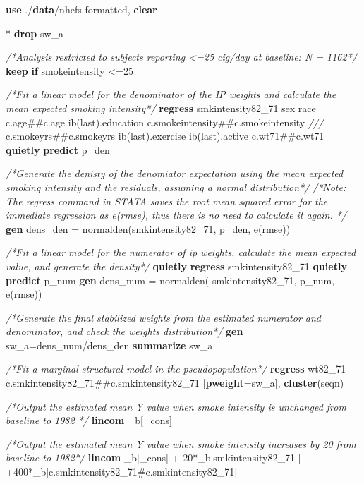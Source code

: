 \documentclass[
  10pt,
]{book}
\newenvironment{Shaded}{\begin{snugshade}}{\end{snugshade}}
\newcommand{\CommentTok}[1]{\textcolor[rgb]{0.56,0.35,0.01}{\textit{#1}}}
\newcommand{\DataTypeTok}[1]{\textcolor[rgb]{0.13,0.29,0.53}{#1}}
\newcommand{\FunctionTok}[1]{\textcolor[rgb]{0.00,0.00,0.00}{#1}}
\newcommand{\KeywordTok}[1]{\textcolor[rgb]{0.13,0.29,0.53}{\textbf{#1}}}
\newcommand{\NormalTok}[1]{#1}
\begin{document}
\begin{Shaded}
\begin{Highlighting}[]
\KeywordTok{use}\NormalTok{ ./}\KeywordTok{data}\NormalTok{/nhefs{-}formatted, }\KeywordTok{clear}

\NormalTok{* }\KeywordTok{drop}\NormalTok{ sw\_a}

\CommentTok{/*Analysis restricted to subjects reporting \textless{}=25 cig/day at baseline: N = 1162*/}
\KeywordTok{keep} \KeywordTok{if}\NormalTok{ smokeintensity \textless{}=25}

\CommentTok{/*Fit a linear model for the denominator of the IP weights and calculate the mean expected smoking intensity*/} 
\KeywordTok{regress}\NormalTok{ smkintensity82\_71 sex race c.age\#\#c.age ib(}\FunctionTok{last}\NormalTok{).education c.smokeintensity\#\#c.smokeintensity }\CommentTok{///}
\NormalTok{c.smokeyrs\#\#c.smokeyrs ib(}\FunctionTok{last}\NormalTok{).exercise ib(}\FunctionTok{last}\NormalTok{).active c.wt71\#\#c.wt71}
\KeywordTok{quietly} \KeywordTok{predict}\NormalTok{ p\_den}

\CommentTok{/*Generate the denisty of the denomiator expectation using the mean expected smoking intensity and the residuals, assuming a normal distribution*/}
\CommentTok{/*Note: The regress command in STATA saves the root mean squared error for the immediate regression as e(rmse), thus there is no need to calculate it again. */}
\KeywordTok{gen}\NormalTok{ dens\_den = }\FunctionTok{normalden}\NormalTok{(smkintensity82\_71, p\_den, }\FunctionTok{e}\NormalTok{(rmse))}

\CommentTok{/*Fit a linear model for the numerator of ip weights, calculate the mean expected value, and generate the density*/}
\KeywordTok{quietly} \KeywordTok{regress}\NormalTok{ smkintensity82\_71}
\KeywordTok{quietly} \KeywordTok{predict}\NormalTok{ p\_num}
\KeywordTok{gen}\NormalTok{ dens\_num = }\FunctionTok{normalden}\NormalTok{( smkintensity82\_71, p\_num, }\FunctionTok{e}\NormalTok{(rmse))}

\CommentTok{/*Generate the final stabilized weights from the estimated numerator and denominator, and check the weights distribution*/}
\KeywordTok{gen}\NormalTok{ sw\_a=dens\_num/dens\_den}
\KeywordTok{summarize}\NormalTok{ sw\_a}

\CommentTok{/*Fit a marginal structural model in the pseudopopulation*/}
\KeywordTok{regress}\NormalTok{ wt82\_71  c.smkintensity82\_71\#\#c.smkintensity82\_71 [}\KeywordTok{pweight}\NormalTok{=sw\_a], }\KeywordTok{cluster}\NormalTok{(seqn)}

\CommentTok{/*Output the estimated mean Y value when smoke intensity is unchanged from baseline to 1982 */}
\KeywordTok{lincom}\NormalTok{ \_b[}\DataTypeTok{\_cons}\NormalTok{]}

\CommentTok{/*Output the estimated mean Y value when smoke intensity increases by 20 from baseline to 1982*/}
\KeywordTok{lincom}\NormalTok{ \_b[}\DataTypeTok{\_cons}\NormalTok{] + 20*\_b[smkintensity82\_71 ] +400*\_b[c.smkintensity82\_71\#c.smkintensity82\_71]}
\end{Highlighting}
\end{Shaded}
\end{document}
